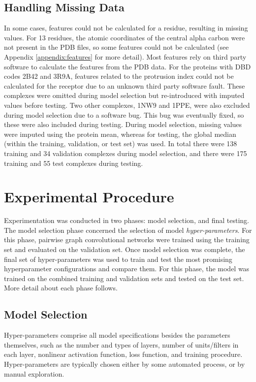 \subsection{Handling Missing Data}
\label{sect:missing_data}

In some cases, features could not be calculated for a residue, resulting in missing values.
For 13 residues, the atomic coordinates of the central alpha carbon were not present in the PDB files, so some features could not be calculated (see Appendix \ref{appendix:features} for more detail).
Most features rely on third party software to calculate the features from the PDB data.
For the proteins with DBD codes 2B42 and 3R9A, features related to the protrusion index could not be calculated for the receptor due to an unknown third party software fault.
These complexes were omitted during model selection but re-introduced with imputed values before testing.
Two other complexes, 1NW9 and 1PPE, were also excluded during model selection due to a software bug.
This bug was eventually fixed, so these were also included during testing. 
During model selection, missing values were imputed using the protein mean, whereas for testing, the global median (within the training, validation, or test set) was used.
In total there were 138 training and 34 validation complexes during model selection, and there were 175 training and 55 test complexes during testing.

\section{Experimental Procedure}

Experimentation was conducted in two phases: model selection, and final testing.
The model selection phase concerned the selection of model \emph{hyper-parameters}.
For this phase, pairwise graph convolutional networks were trained using the training set and evaluated on the validation set.
Once model selection was complete, the final set of hyper-parameters was used to train and test the most promising hyperparameter configurations and compare them.
For this phase, the model was trained on the combined training and validation sets and tested on the test set.
More detail about each phase follows.


\subsection{Model Selection}

Hyper-parameters comprise all model specifications besides the parameters themselves, such as the number and types of layers, number of units/filters in each layer, nonlinear activation function, loss function, and training procedure.
Hyper-parameters are typically chosen either by some automated process, or by manual exploration.


